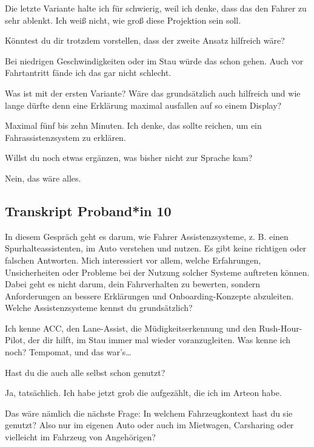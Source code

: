 Die letzte Variante halte ich für schwierig, weil ich denke, dass das
den Fahrer zu sehr ablenkt. Ich weiß nicht, wie groß diese Projektion
sein soll.

\interviewerin
Könntest du dir trotzdem vorstellen, dass der zweite Ansatz hilfreich
wäre?

Bei niedrigen Geschwindigkeiten oder im Stau würde das schon gehen. Auch
vor Fahrtantritt fände ich das gar nicht schlecht.

\interviewerin
Was ist mit der ersten Variante? Wäre das grundsätzlich auch hilfreich
und wie lange dürfte denn eine Erklärung maximal ausfallen auf so einem
Display?

Maximal fünf bis zehn Minuten. Ich denke, das sollte reichen, um ein
Fahrassistenzsystem zu erklären.

\interviewerin
Willst du noch etwas ergänzen, was bisher nicht zur Sprache kam?

Nein, das wäre alles.



\clearpage
\subsection{Transkript Proband*in 10}
\label{subsec:transkript-p10}

\interviewerin
In diesem Gespräch geht es darum, wie Fahrer Assistenzsysteme, z. B.
einen Spurhalteassistenten, im Auto verstehen und nutzen. Es gibt keine
richtigen oder falschen Antworten. Mich interessiert vor allem, welche
Erfahrungen, Unsicherheiten oder Probleme bei der Nutzung solcher
Systeme auftreten können. Dabei geht es nicht darum, dein Fahrverhalten
zu bewerten, sondern Anforderungen an bessere Erklärungen und
Onboarding-Konzepte abzuleiten. Welche Assistenzsysteme kennst du
grundsätzlich?

Ich kenne ACC, den Lane-Assist, die Müdigkeitserkennung und den
Rush-Hour-Pilot, der dir hilft, im Stau immer mal wieder voranzugleiten.
Was kenne ich noch? Tempomat, und das war's…

\interviewerin
Hast du die auch alle selbst schon genutzt?

Ja, tatsächlich. Ich habe jetzt grob die aufgezählt, die ich im Arteon
habe.

\interviewerin
Das wäre nämlich die nächste Frage: In welchem Fahrzeugkontext hast du
sie genutzt? Also nur im eigenen Auto oder auch im Mietwagen,
Carsharing oder vielleicht im Fahrzeug von Angehörigen?


